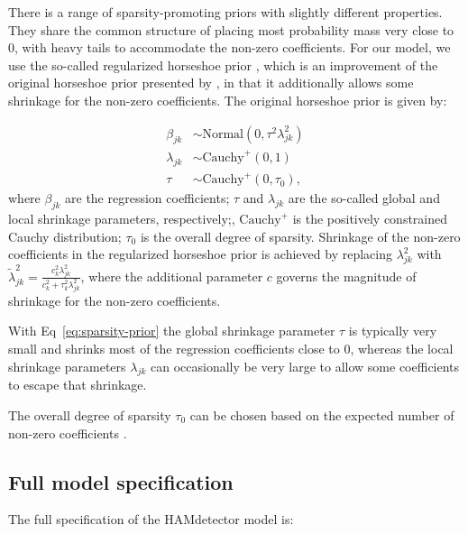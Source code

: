 \documentclass{bioinfo}
\begin{document}
\begin{methods}
There is a range of sparsity-promoting priors with slightly different properties. They share the common structure of placing most probability mass very close to 0, with heavy tails to accommodate the non-zero coefficients.
For our model, we use the so-called regularized horseshoe prior \citep{Piironen2017}, which is an improvement of the original horseshoe prior presented by \citet{Carvalho2010}, in that it additionally allows some shrinkage for the non-zero coefficients. The original horseshoe prior is given by:

\begin{equation}
  \label{eq:sparsity-prior}
  \begin{aligned}
    \beta_{jk} &\sim \text{Normal}(0, \tau^{2}\lambda^{2}_{jk}) \\
    \lambda_{jk} &\sim \text{Cauchy}^{+}(0, 1) \\
    \tau &\sim \text{Cauchy}^{+}(0, \tau_{0}),
  \end{aligned}
\end{equation}
where \(\beta_{jk}\) are the regression coefficients; \(\tau\) and \(\lambda_{jk}\) are the so-called global and local shrinkage parameters, respectively;, \(\text{Cauchy}^{+}\) is the positively constrained Cauchy distribution; $\tau_0$ is the overall degree of sparsity. Shrinkage of the non-zero coefficients in the regularized horseshoe prior is achieved by replacing \(\lambda_{jk}^2\) with \(\tilde{\lambda}^{2}_{jk} = \frac{c_{k}^{2}\lambda_{jk}^{2}}{c_{k}^{2} + \tau_{k}^{2}\lambda_{jk}^{2}}\), where the additional parameter \(c\) governs the magnitude of shrinkage for the non-zero coefficients.

With Eq~\ref{eq:sparsity-prior} the global shrinkage parameter \(\tau\) is typically very small and shrinks most of the regression coefficients close to 0, whereas the local shrinkage parameters $\lambda_{jk}$ can occasionally be very large to allow some coefficients to escape that shrinkage.

The overall degree of sparsity $\tau_0$ can be chosen based on the expected number of non-zero coefficients \citep{Piironen2016}.

\subsection{Full model specification}

The full specification of the HAMdetector model is:


\end{methods}
\end{document}

